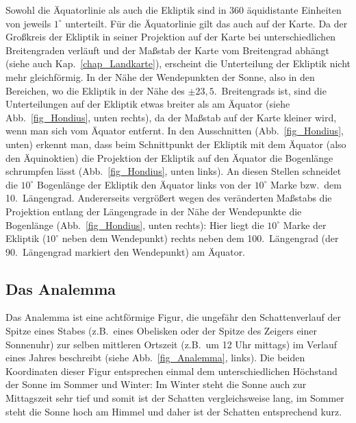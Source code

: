 Sowohl die \"Aquatorlinie als auch die Ekliptik sind in $360$ \"aquidistante Einheiten von
jeweils $1^\circ$ unterteilt. F\"ur die \"Aquatorlinie gilt das auch auf der Karte. Da der Gro\ss kreis
der Ekliptik in seiner Projektion auf der Karte bei unterschiedlichen Breitengraden verl\"auft und
der Ma\ss stab der Karte vom Breitengrad abh\"angt (siehe auch Kap.\ \ref{chap_Landkarte}),
erscheint die Unterteilung der Ekliptik nicht mehr gleichf\"ormig.
In der N\"ahe der Wendepunkten der Sonne, also in den Bereichen, wo die
Ekliptik in der N\"ahe des $\pm 23,5$.\ Breitengrads ist, sind die Unterteilungen auf der Ekliptik etwas
breiter als am \"Aquator (siehe Abb.\ \ref{fig_Hondius}, unten rechts), da der Ma\ss stab auf der Karte kleiner
wird, wenn man sich vom \"Aquator entfernt. In den Ausschnitten (Abb.\ \ref{fig_Hondius}, unten)
erkennt man, dass beim Schnittpunkt der Ekliptik mit dem \"Aquator (also den \"Aquinoktien) die
Projektion der Ekliptik auf den \"Aquator die Bogenl\"ange schrumpfen l\"asst (Abb.\ \ref{fig_Hondius}, unten links).
An diesen Stellen schneidet die $10^\circ$ Bogenl\"ange der Ekliptik den \"Aquator links von der
$10^\circ$ Marke bzw.\ dem 10.\ L\"angengrad. Andererseits vergr\"o\ss ert
wegen des ver\"anderten Ma\ss stabs die Projektion entlang der L\"angengrade in der
N\"ahe der Wendepunkte die Bogenl\"ange (Abb.\ \ref{fig_Hondius}, unten rechts): Hier liegt die
$10^\circ$ Marke der Ekliptik ($10^\circ$ neben dem Wendepunkt) rechts neben dem 100.\ L\"angengrad
(der 90.\ L\"angengrad markiert den Wendepunkt) am \"Aquator. 

\subsection{Das Analemma}
\label{sec_Analemma}

Das Analemma 
ist eine achtf\"ormige Figur, die ungef\"ahr den Schattenverlauf der Spitze
eines Stabes (z.B.\ eines Obelisken oder der Spitze des Zeigers einer Sonnenuhr) zur
selben mittleren Ortszeit (z.B.\ um 12 Uhr mittags) im Verlauf eines Jahres beschreibt (siehe
Abb.\ \ref{fig_Analemma}, links). 
Die beiden Koordinaten dieser Figur entsprechen einmal dem unterschiedlichen H\"ochstand
der Sonne im Sommer und Winter: Im Winter steht die Sonne auch zur Mittagszeit sehr tief
und somit ist der Schatten vergleichsweise lang, im Sommer steht die Sonne hoch am
Himmel und daher ist der Schatten entsprechend kurz. 

